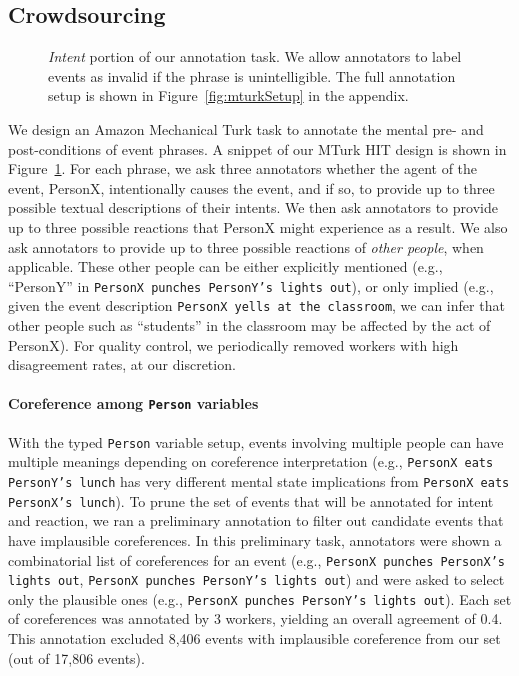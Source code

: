 \documentclass[11pt,a4paper]{article}
\begin{document}
\subsection{Crowdsourcing}
\begin{figure}[t]
    \centering
    \caption{\textit{Intent} portion of our annotation task. We allow annotators to label events as invalid if the phrase is unintelligible. The full annotation setup is shown in Figure~\ref{fig:mturkSetup} in the appendix.
    \label{fig:mturkSetupShort}}
\end{figure}
We design an Amazon Mechanical Turk task to annotate the mental pre- and post-conditions of event phrases. A snippet of our MTurk HIT design is shown in Figure~\ref{fig:mturkSetupShort}.
For each phrase, we ask three annotators whether the agent of the event, PersonX, intentionally causes the event, and if so, to provide up to three possible textual descriptions of their intents.
We then ask annotators to provide up to three possible reactions that PersonX might experience as a result. 
We also ask annotators to provide up to three possible reactions of \emph{other people}, when applicable. These other people can be either explicitly mentioned (e.g., ``PersonY'' in \texttt{PersonX punches PersonY's lights out}), or only implied (e.g., given the event description \texttt{PersonX yells at the classroom}, we can infer that other people such as ``students'' in the classroom may be affected by the act of PersonX). 
For quality control, 
we periodically removed workers with high disagreement rates, at our discretion.





\paragraph{Coreference among \texttt{Person} variables} 
With the typed \texttt{Person} variable setup, events involving multiple people can have multiple meanings depending on coreference interpretation (e.g., \texttt{PersonX eats PersonY's lunch} has very different mental state implications from \texttt{PersonX eats PersonX's lunch}).
To prune the set of events that will be annotated for intent and reaction, we ran a preliminary annotation to filter out candidate events that have implausible coreferences.
In this preliminary task, annotators were shown a combinatorial list of coreferences for an event (e.g., \texttt{PersonX punches PersonX's lights out}, \texttt{PersonX punches PersonY's lights out}) and were asked to select only the plausible ones (e.g., \texttt{PersonX punches PersonY's lights out}).
Each set of coreferences was annotated by 3  workers, yielding an overall agreement of  0.4.
This annotation excluded 8,406 events with implausible coreference from our set (out of 17,806 events).
\end{document}
